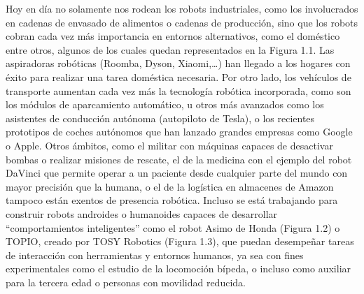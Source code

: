 Hoy en día no solamente nos rodean los robots industriales, como los involucrados en cadenas de envasado de alimentos o cadenas de producción, sino que los robots cobran cada vez más importancia en entornos alternativos, como el doméstico entre otros, algunos de los cuales quedan representados en la Figura 1.1. Las aspiradoras robóticas (Roomba, Dyson, Xiaomi,…) han llegado a los hogares con éxito para realizar una tarea doméstica necesaria. Por otro lado, los vehículos de transporte aumentan cada vez más la tecnología robótica incorporada, como son los módulos de aparcamiento automático, u otros más avanzados como los asistentes de conducción autónoma (autopiloto de Tesla), o los recientes prototipos de coches autónomos que han lanzado grandes empresas como Google o Apple. Otros ámbitos, como el militar con máquinas capaces de desactivar bombas o realizar misiones de rescate, el de la medicina con el ejemplo del robot DaVinci que permite operar a un paciente desde cualquier parte del mundo con mayor precisión que la humana, o el de la logística en almacenes de Amazon tampoco están exentos de presencia robótica. Incluso se está trabajando para construir robots androides o humanoides capaces de desarrollar “comportamientos inteligentes” como el robot Asimo de Honda (Figura 1.2) o TOPIO, creado por TOSY Robotics (Figura 1.3), que puedan desempeñar tareas de interacción con herramientas y entornos humanos, ya sea con fines experimentales como el estudio de la locomoción bípeda, o incluso como auxiliar para la tercera edad o personas con movilidad reducida.

